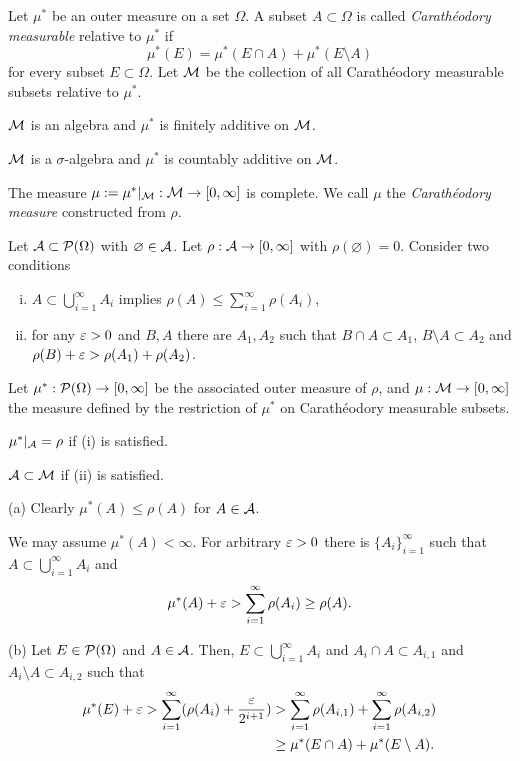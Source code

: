 \documentclass{../note}
\begin{document}
\begin{prb}
Let $\mu^*$ be an outer measure on a set $\Omega$.
A subset $A\subset \Omega$ is called \emph{Carath\'eodory measurable} relative to $\mu^*$ if
\[\mu^*(E)=\mu^*(E\cap A)+\mu^*(E\setminus A)\]
for every subset $E\subset\Omega$.
Let $\mathcal{M}$ be the collection of all Carath\'eodory measurable subsets relative to $\mu^*$.
\begin{parts}
\item $\mathcal{M}$ is an algebra and $\mu^*$ is finitely additive on $\mathcal{M}$.
\item $\mathcal{M}$ is a $\sigma$-algebra and $\mu^*$ is countably additive on $\mathcal{M}$.
\item The measure $\mu:=\mu^*|_{\mathcal{M}}:\mathcal{M}\to[0,\infty]$ is complete.
We call $\mu$ the \emph{Carath\'eodory measure} constructed from $\rho$.
\end{parts}
\end{prb}


\begin{prb}
Let $\mathcal{A}\subset\mathcal{P}(\Omega)$ with $\varnothing\in\mathcal{A}$.
Let $\rho:\mathcal{A}\to[0,\infty]$ with $\rho(\varnothing)=0$.
Consider two conditions
\begin{enumerate}[(i)]
\item $A\subset\bigcup_{i=1}^\infty A_i$ implies $\rho(A)\le\sum_{i=1}^\infty\rho(A_i)$,
\item for any $\varepsilon>0$ and $B,A$ there are $A_1,A_2$ such that $B\cap A\subset A_1$, $B\setminus A\subset A_2$ and $\rho(B)+\varepsilon>\rho(A_1)+\rho(A_2)$.
\end{enumerate}
Let $\mu^*:\mathcal{P}(\Omega)\to[0,\infty]$ be the associated outer measure of $\rho$, and $\mu:\mathcal{M}\to[0,\infty]$ the measure defined by the restriction of $\mu^*$ on Carath\'eodory measurable subsets.
\begin{parts}
\item $\mu^*|_{\mathcal{A}}=\rho$ if (i) is satisfied.
\item $\mathcal{A}\subset\mathcal{M}$ if (ii) is satisfied.
\end{parts}
\end{prb}
\begin{pf}
(a)
Clearly $\mu^*(A)\le\rho(A)$ for $A\in\mathcal{A}$.

We may assume $\mu^*(A)<\infty$.
For arbitrary $\varepsilon>0$ there is $\{A_i\}_{i=1}^\infty$ such that $A\subset\bigcup_{i=1}^\infty A_i$ and
\[\mu^*(A)+\varepsilon>\sum_{i=1}^\infty\rho(A_i)\ge\rho(A).\]

(b)
Let $E\in\mathcal{P}(\Omega)$ and $A\in\mathcal{A}$.
Then,
$E\subset \bigcup_{i=1}^\infty A_i$ and $A_i\cap A\subset A_{i,1}$ and $A_i\setminus A\subset A_{i,2}$ such that
\begin{align*}
\mu^*(E)+\varepsilon>\sum_{i=1}^\infty(\rho(A_i)+\frac{\varepsilon}{2^{i+1}})
&>\sum_{i=1}^\infty\rho(A_{i,1})+\sum_{i=1}^\infty\rho(A_{i,2})\\
&\ge\mu^*(E\cap A)+\mu^*(E\setminus A).
\end{align*}
\end{pf}
\end{document}
